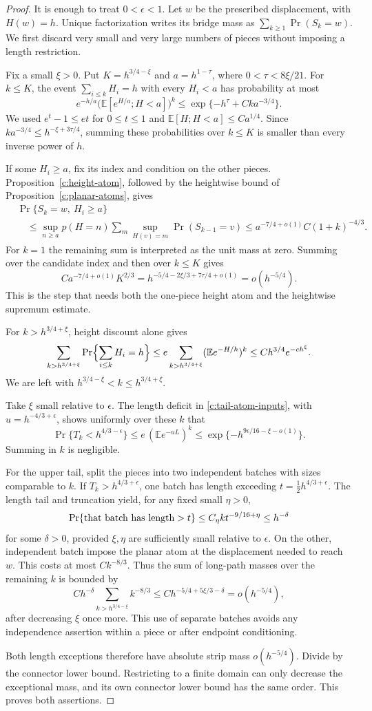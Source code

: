 \begin{proof}
It is enough to treat $0<\epsilon<1$.  Let $w$ be the prescribed
displacement, with $H(w)=h$.  Unique
factorization writes its bridge mass as
$\sum_{k\ge1}\Pr(S_k=w)$.  We first discard very small and very large
numbers of pieces without imposing a length restriction.

Fix a small $\xi>0$.  Put $K=h^{3/4-\xi}$ and
$a=h^{1-\tau}$, where $0<\tau<8\xi/21$.  For $k\le K$, the event
$\sum_{i\le k}H_i=h$ with every $H_i<a$ has probability at most
\[
 e^{-h/a}\bigl(\mathbb E[e^{H/a};H<a]\bigr)^k
 \le\exp\{-h^\tau+Cka^{-3/4}\}.
\]
We used $e^t-1\le et$ for $0\le t\le1$ and
$\mathbb E[H;H<a]\le Ca^{1/4}$.  Since
$ka^{-3/4}\le h^{-\xi+3\tau/4}$, summing these probabilities over
$k\le K$ is smaller than every inverse power of $h$.

If some $H_i\ge a$, fix its index and condition on the other pieces.
Proposition~\ref{c:height-atom}, followed by the heightwise bound of
Proposition~\ref{c:planar-atoms}, gives
\begin{align*}
 &\Pr\{S_k=w,\ H_i\ge a\}\\
 &\quad\le
 \sup_{n\ge a}p(H=n)
 \sum_m\sup_{H(v)=m}\Pr(S_{k-1}=v)
 \le a^{-7/4+o(1)}C(1+k)^{-4/3}.
\end{align*}
For $k=1$ the remaining sum is interpreted as the unit mass at zero.
Summing over the candidate index and then over $k\le K$ gives
\[
 C a^{-7/4+o(1)}K^{2/3}
 =h^{-5/4-2\xi/3+7\tau/4+o(1)}
 =o(h^{-5/4}).
\]
This is the step that needs both the one-piece height atom and the
heightwise supremum estimate.

For $k>h^{3/4+\xi}$, height discount alone gives
\[
 \sum_{k>h^{3/4+\xi}}\Pr\Bigl\{\sum_{i\le k}H_i=h\Bigr\}
 \le e\sum_{k>h^{3/4+\xi}}(\mathbb E e^{-H/h})^k
 \le Ch^{3/4}e^{-ch^\xi}.
\]
We are left with
$h^{3/4-\xi}<k\le h^{3/4+\xi}$.

Take $\xi$ small relative to $\epsilon$.  The length deficit in
\eqref{c:tail-atom-inputs}, with
$u=h^{-4/3+\epsilon}$, shows uniformly over these $k$ that
\[
 \Pr\{T_k<h^{4/3-\epsilon}\}
 \le e\,(\mathbb E e^{-uL})^k
 \le\exp\{-h^{9\epsilon/16-\xi-o(1)}\}.
\]
Summing in $k$ is negligible.

For the upper tail, split the pieces into two independent batches with
sizes comparable to $k$.  If $T_k>h^{4/3+\epsilon}$, one batch has
length exceeding $t=\tfrac12h^{4/3+\epsilon}$.  The length tail and
truncation yield, for any fixed small $\eta>0$,
\[
 \Pr\{\hbox{that batch has length}>t\}
 \le C_\eta k t^{-9/16+\eta}
 \le h^{-\delta}
\]
for some $\delta>0$, provided $\xi,\eta$ are sufficiently small
relative to $\epsilon$.  On the other, independent batch impose the
planar atom at the displacement needed to reach $w$.  This costs at
most $Ck^{-8/3}$.  Thus the sum of long-path masses over the remaining
$k$ is bounded by
\[
 C h^{-\delta}
 \sum_{k>h^{3/4-\xi}}k^{-8/3}
 \le C h^{-5/4+5\xi/3-\delta}=o(h^{-5/4}),
\]
after decreasing $\xi$ once more.  This use of separate batches avoids
any independence assertion within a piece or after endpoint
conditioning.

Both length exceptions therefore have absolute strip mass
$o(h^{-5/4})$.  Divide by the connector lower bound.  Restricting to a
finite domain can only decrease the exceptional mass, and its own
connector lower bound has the same order.  This proves both assertions.
\end{proof}
